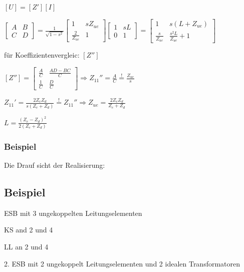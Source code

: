 $[U] = [Z'][I]$


$\begin{bmatrix}
    A & B \\ C & D
\end{bmatrix} = 
\frac{1}{\sqrt{1 - s^2}} \begin{bmatrix}
    1 & sZ_{ue} \\ \frac{2}{Z_{ue}} & 1
\end{bmatrix} \begin{bmatrix}
    1 & sL \\ 0 & 1
\end{bmatrix} = \begin{bmatrix}
    1 & s(L + Z_{ue}) \\ \frac{s}{Z_{ue}} & \frac{s^2L}{Z_{ue}} + 1
\end{bmatrix}$

für Koeffizientenvergleic: $[Z'']$

$[Z''] = \begin{bmatrix}
    \frac{A}{C} & \frac{AD - BC}{C} \\ \frac{1}{C} & \frac{D}{C}
\end{bmatrix} \Rightarrow Z_{11}'' = \frac{A}{C} \overset{!}{=} \frac{Z_{ue}}{s}$

$Z_{11}' = \frac{2Z_eZ_d}{s(Z_e + Z_d)} \overset{!}{=} Z_{11}'' \Rightarrow Z_{ue} = \frac{2Z_eZ_d}{Z_e + Z_d}$

$L = \frac{(Z_e - Z_d)^2}{2(Z_e + Z_d)}$


\subsubsection{Beispiel}


Die Drauf sicht der Realisierung:

\subsection{Beispiel}
ESB mit 3 ungekoppelten Leitungselementen

KS and 2 und 4



LL an 2 und 4



2. ESB mit 2 ungekoppelt Leitungselementen und 2 idealen Transformatoren 

